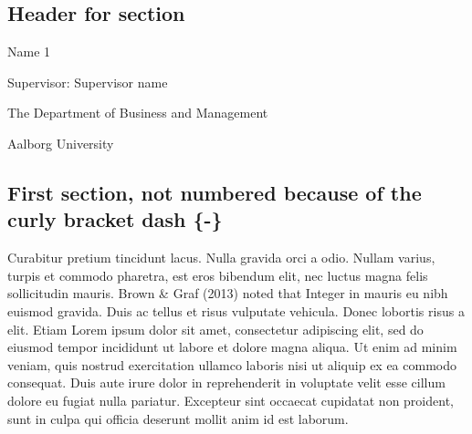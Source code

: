 \documentclass[10pt,twoside]{article}
\begin{document}
\cleardoublepage
\FloatBarrier



\begin{centering}

\vspace{1 cm}

\Huge

\section*{Header for section}
\addtocounter{section}{1}

\vspace{1 cm}

\Large
Name 1

\normalsize
Supervisor: Supervisor name

\vspace{1 cm}

\Large


\vspace{1 cm}

\normalsize
The Department of Business and Management

Aalborg University

\vspace{1 cm}

\end{centering}

\FloatBarrier
\newpage


\hypertarget{first-section-not-numbered-because-of-the-curly-bracket-dash--}{%
\subsection*{First section, not numbered because of the curly bracket
dash
\{-\}}\label{first-section-not-numbered-because-of-the-curly-bracket-dash--}}

Curabitur pretium tincidunt lacus. Nulla gravida orci a odio. Nullam
varius, turpis et commodo pharetra, est eros bibendum elit, nec luctus
magna felis sollicitudin mauris. Brown \& Graf (2013) noted that Integer
in mauris eu nibh euismod gravida. Duis ac tellus et risus vulputate
vehicula. Donec lobortis risus a elit. Etiam Lorem ipsum dolor sit amet,
consectetur adipiscing elit, sed do eiusmod tempor incididunt ut labore
et dolore magna aliqua. Ut enim ad minim veniam, quis nostrud
exercitation ullamco laboris nisi ut aliquip ex ea commodo consequat.
Duis aute irure dolor in reprehenderit in voluptate velit esse cillum
dolore eu fugiat nulla pariatur. Excepteur sint occaecat cupidatat non
proident, sunt in culpa qui officia deserunt mollit anim id est laborum.
\end{document}
